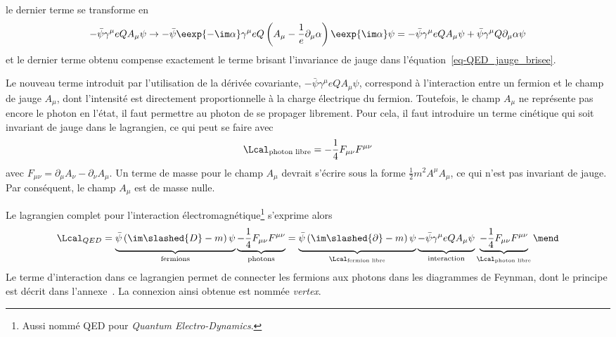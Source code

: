 le dernier terme se transforme en
\begin{equation}
-\bar{\psi}\gamma^\mu eQA_\mu \psi
\to
-\bar{\psi}\eexp{-\im \alpha}
\gamma^\mu
eQ\left(A_\mu - \frac{1}{e}\partial_\mu\alpha\right)
\eexp{\im \alpha}\psi
=
-\bar{\psi} \gamma^\mu eQA_\mu \psi
+
\bar{\psi} \gamma^\mu  Q\partial_\mu\alpha \psi
\end{equation}
et le dernier terme obtenu compense exactement le terme brisant l'invariance de jauge dans l'équation~\eqref{eq-QED_jauge_brisee}.
\par Le nouveau terme introduit par l'utilisation de la dérivée covariante, $- \bar{\psi}\gamma^\mu eQA_\mu \psi$, correspond à l'interaction entre un fermion et le champ de jauge $A_\mu$, dont l'intensité est directement proportionnelle à la charge électrique du fermion.
Toutefois, le champ $A_\mu$ ne représente pas encore le photon en l'état, il faut permettre au photon de se propager librement. Pour cela, il faut introduire un terme cinétique qui soit invariant de jauge dans le lagrangien, ce qui peut se faire avec
\begin{equation}
\Lcal_{\text{photon libre}} = - \frac{1}{4} F_{\mu\nu}F^{\mu\nu}
\end{equation}
avec $F_{\mu\nu} = \partial_\mu A_\nu - \partial_\nu A_\mu$.
Un terme de masse pour le champ $A_\mu$ devrait s'écrire sous la forme $\frac{1}{2}m^2A^\mu A_\mu$, ce qui n'est pas invariant de jauge. Par conséquent, le champ $A_\mu$ est de masse nulle.
\par Le lagrangien complet pour l'interaction électromagnétique\footnote{Aussi nommé QED pour \emph{Quantum Electro-Dynamics}.} s'exprime alors
\begin{equation}
\Lcal_{QED}
=
\underbrace{\bar{\psi} \left( \im\slashed{D} - m \right) \psi \vphantom{\frac{1}{4}}}_{\text{fermions}}
\underbrace{- \frac{1}{4} F_{\mu\nu}F^{\mu\nu} \vphantom{\frac{1}{4}}}_{\text{photons}}
=
\underbrace{\bar{\psi} \left( \im\slashed{\partial} - m \right) \psi \vphantom{\frac{1}{4}}}_{\Lcal_{\text{fermion libre}}}
\underbrace{- \bar{\psi}\gamma^\mu eQA_\mu \psi \vphantom{\frac{1}{4}}}_{\text{interaction}}
\underbrace{- \frac{1}{4} F_{\mu\nu}F^{\mu\nu} \vphantom{\frac{1}{4}}}_{\Lcal_{\text{photon libre}}}
\mend
\end{equation}
Le terme d'interaction dans ce lagrangien permet de \og connecter \fg{} les fermions aux photons dans les diagrammes de Feynman, dont le principe est décrit dans l'annexe~.
La \og connexion \fg{} ainsi obtenue est nommée \emph{vertex}.
